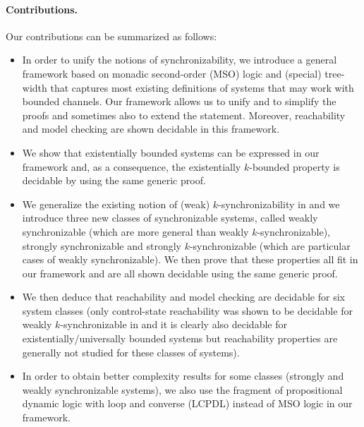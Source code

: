 \documentclass[a4paper,UKenglish,cleveref, autoref, thm-restate]{lipics-v2021}
\begin{document}
\paragraph*{Contributions.}
Our contributions can be summarized as follows:
\begin{itemize}
\item
In order to unify the notions of synchronizability, we introduce a general
framework based on monadic second-order (MSO) logic and (special) tree-width
that captures most existing definitions of systems that may work with bounded
channels. Our framework allows us to unify and to simplify the proofs and
sometimes also to extend the statement. Moreover, reachability and model
checking are shown decidable in this framework.

\item We show that existentially %
bounded systems can be expressed in our framework and, as a consequence, the existentially %
$k$-bounded property is decidable by using the same generic proof.

\item We generalize the existing notion of (weak) $k$-synchronizability in \cite{DBLP:conf/cav/BouajjaniEJQ18}
and we introduce three new classes of synchronizable systems, called weakly synchronizable (which are more general than weakly $k$-synchronizable), strongly synchronizable and strongly $k$-synchronizable (which are particular cases of weakly synchronizable). We then prove that these properties all fit in our framework and are all shown decidable using the same generic proof.
%

\item We then deduce that reachability and model
checking are decidable for
six system classes (only control-state reachability was shown to be decidable for weakly $k$-synchronizable  in \cite{DBLP:conf/cav/BouajjaniEJQ18} and it is clearly also decidable for existentially/universally bounded systems but reachability properties are generally not studied for these classes of systems).

\item In order to obtain better complexity results for some classes (strongly and weakly synchronizable systems), we also use the fragment of propositional dynamic logic with loop and converse (LCPDL) instead of MSO logic in our framework.
%


\end{itemize}
\end{document}
